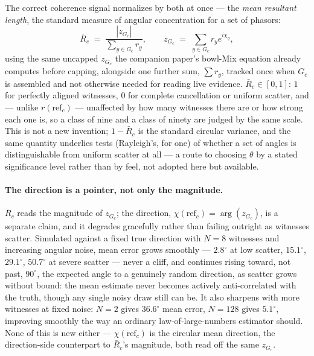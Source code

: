 \documentclass[12pt, a4paper]{article}
\begin{document}
The correct coherence signal normalizes by both at once --- the
\emph{mean resultant length}, the standard measure of angular
concentration for a set of phasors:
\begin{equation}
    \bar R_c \;=\; \frac{|z_{G_c}|}{\sum_{y\in G_c} r_y},
    \qquad
    z_{G_c} \;=\; \sum_{y\in G_c} r_y e^{i\chi_y},
    \label{eq:coherence}
\end{equation}
using the same uncapped $z_{G_c}$ the companion paper's bowl-Mix
equation already computes before capping, alongside one further sum,
$\sum r_y$, tracked once when $G_c$ is assembled and not otherwise
needed for reading live evidence. $\bar R_c\in[0,1]$: $1$ for
perfectly aligned witnesses, $0$ for complete cancellation or uniform
scatter, and --- unlike $r(\mathrm{ref}_c)$ --- unaffected by how many
witnesses there are or how strong each one is, so a class of nine and
a class of ninety are judged by the same scale. This is not a new
invention; $1-\bar R_c$ is the standard circular variance, and the
same quantity underlies tests (Rayleigh's, for one) of whether a set
of angles is distinguishable from uniform scatter at all --- a route
to choosing $\theta$ by a stated significance level rather than by
feel, not adopted here but available.

\paragraph{The direction is a pointer, not only the magnitude.}
\label{par:direction_pointer}
$\bar R_c$ reads the magnitude of $z_{G_c}$; the direction,
$\chi(\mathrm{ref}_c)=\arg(z_{G_c})$, is a separate claim, and it
degrades gracefully rather than failing outright as witnesses
scatter. Simulated against a fixed true direction with $N=8$
witnesses and increasing angular noise, mean error grows smoothly
--- $2.8^\circ$ at low scatter, $15.1^\circ$, $29.1^\circ$,
$50.7^\circ$ at severe scatter --- never a cliff, and continues
rising toward, not past, $90^\circ$, the expected angle to a
genuinely random direction, as scatter grows without bound: the mean
estimate never becomes actively anti-correlated with the truth,
though any single noisy draw still can be. It also sharpens with
more witnesses at fixed noise: $N=2$ gives $36.6^\circ$ mean error,
$N=128$ gives $5.1^\circ$, improving smoothly the way an ordinary
law-of-large-numbers estimator should. None of this is new either
--- $\chi(\mathrm{ref}_c)$ is the circular mean direction, the
direction-side counterpart to $\bar R_c$'s magnitude, both read off
the same $z_{G_c}$.
\end{document}
